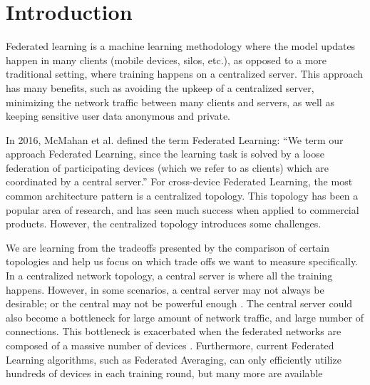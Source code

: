 \documentclass[10pt,twocolumn,letterpaper]{article}
\theoremstyle{definition}
\begin{document}
\section{Introduction}



Federated learning is a machine learning methodology where the model updates happen in many clients (mobile devices, silos, etc.), as opposed to a more traditional setting, where training happens on a centralized server. This approach has many benefits, such as avoiding the upkeep of a centralized server, minimizing the network traffic between many clients and servers, as well as keeping sensitive user data anonymous and private. 

In 2016, McMahan et al.\cite{2016arXiv160205629B} defined the term Federated Learning: “We term our approach Federated Learning, since the learning task is solved by a loose federation of participating devices (which we refer to as clients) which are coordinated by a central server.” For cross-device Federated Learning, the most common architecture pattern is a centralized topology. This topology has been a popular area of research, and has seen much success when applied to commercial products. However, the centralized topology introduces some challenges. 

We are learning from the tradeoffs presented by the comparison of certain topologies and help us focus on which trade offs we want to measure specifically.
In a centralized network topology, a central server is where all the training happens. However, in some scenarios, a central server may not always be desirable; or the central may not be powerful enough \cite{2016arXiv161005202V}. The central server could also become a bottleneck for large amount of network traffic, and large number of connections. This bottleneck is exacerbated when the federated networks are composed of a massive number of devices \cite{2017arXiv170509056L}. Furthermore, current Federated Learning algorithms, such as Federated Averaging, can only efficiently utilize hundreds of devices in each training round, but many more are available \cite{2019arXiv190201046B}
\end{document}
